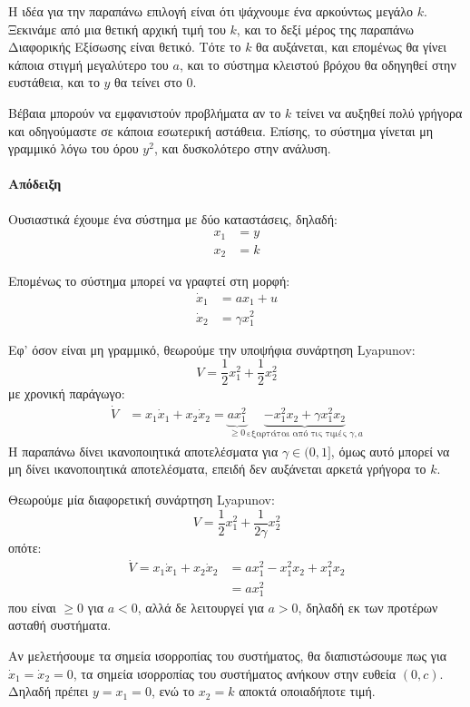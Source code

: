 \documentclass[11pt,a4paper,notitlepage,fleqn]{article}
\begin{document}
Η ιδέα για την παραπάνω επιλογή είναι ότι ψάχνουμε ένα αρκούντως μεγάλο
\( k \). Ξεκινάμε από μια θετική αρχική τιμή του \( k \), και το δεξί μέρος
της παραπάνω Διαφορικής Εξίσωσης είναι θετικό. Τότε το \( k \) θα αυξάνεται,
και επομένως θα γίνει κάποια στιγμή μεγαλύτερο του \( a \), και το σύστημα
κλειστού βρόχου θα οδηγηθεί στην ευστάθεια, και το \( y \) θα τείνει στο 0.

Βέβαια μπορούν να εμφανιστούν προβλήματα αν το \( k \) τείνει να αυξηθεί
πολύ γρήγορα και οδηγούμαστε σε κάποια εσωτερική αστάθεια. Επίσης, το σύστημα γίνεται μη γραμμικό λόγω του όρου \( y^2 \), και δυσκολότερο
στην ανάλυση.

\paragraph{Απόδειξη}
Ουσιαστικά έχουμε ένα σύστημα με δύο καταστάσεις, δηλαδή:
\begin{align*}
	x_1 &= y \\
	x_2 &= k
\end{align*}

Επομένως το σύστημα μπορεί να γραφτεί στη μορφή:
\begin{align*}
	\dot x_1 &= ax_1 + u\\
	\dot x_2 &= γx_1^2
\end{align*}

Εφ' όσον είναι μη γραμμικό, θεωρούμε την υποψήφια συνάρτηση Lyapunov:
\[
V = \frac{1}{2} x_1^2 + \frac{1}{2} x_2^2
\]
με χρονική παράγωγο:
\begin{align*}
	\dot V &=
	x_1\dot x_1 + x_2\dot x_2
	=
	\underbrace{ax_1^2}_{\geq 0}
	\underbrace{- x_1^2 x_2
	+ γx_1^2 x_2}_{\text{εξαρτάται από τις τιμές } \gamma,a}
\end{align*}
Η παραπάνω δίνει ικανοποιητικά αποτελέσματα για \( γ\in (0,1] \), όμως
αυτό μπορεί να μη δίνει ικανοποιητικά αποτελέσματα, επειδή δεν αυξάνεται
αρκετά γρήγορα το \( k \).

Θεωρούμε μία διαφορετική συνάρτηση Lyapunov:
\[
V = \frac{1}{2} x_1^2 + \frac{1}{2\gamma} x_2^2
\]
οπότε:
\begin{align*}
	\dot V =
	x_1\dot x_1 + x_2\dot x_2
	&=
	ax_1^2
	- x_1^2 x_2 + x_1^2 x_2
	\\ &= ax_1^2
\end{align*}
που είναι \( \geq 0 \) για \( a < 0 \), αλλά δε λειτουργεί για \( a>0 \),
δηλαδή εκ των προτέρων ασταθή συστήματα.

Αν μελετήσουμε τα σημεία ισορροπίας του συστήματος, θα διαπιστώσουμε
πως για \( \dot x_1 = \dot x_2 = 0 \), τα σημεία ισορροπίας του συστήματος
ανήκουν στην ευθεία \( (0,c) \). Δηλαδή πρέπει \( y = x_1 = 0 \), ενώ
το \( x_2 = k \) αποκτά οποιαδήποτε τιμή.
\end{document}
